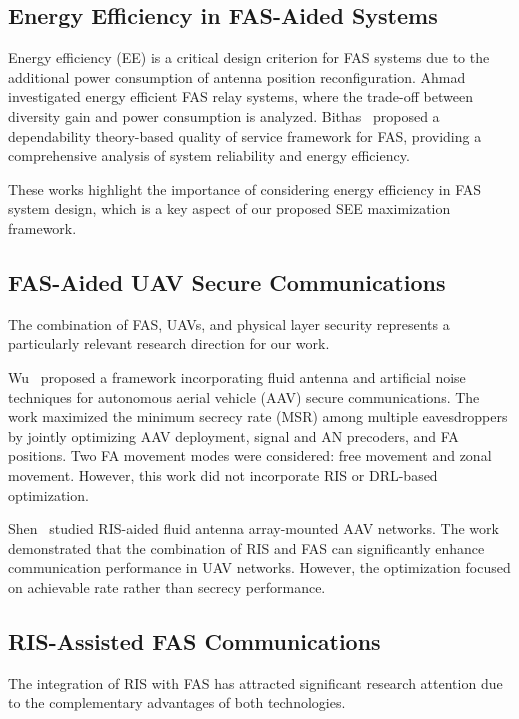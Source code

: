 \subsection{Energy Efficiency in FAS-Aided Systems}

Energy efficiency (EE) is a critical design criterion for FAS systems due to the additional power consumption of antenna position reconfiguration. Ahmad~\cite{ahmad2025energy} investigated energy efficient FAS relay systems, where the trade-off between diversity gain and power consumption is analyzed. Bithas~\cite{bithas2025dependability} proposed a dependability theory-based quality of service framework for FAS, providing a comprehensive analysis of system reliability and energy efficiency.

These works highlight the importance of considering energy efficiency in FAS system design, which is a key aspect of our proposed SEE maximization framework.

\subsection{FAS-Aided UAV Secure Communications}

The combination of FAS, UAVs, and physical layer security represents a particularly relevant research direction for our work.

Wu~\cite{wu2025faaav} proposed a framework incorporating fluid antenna and artificial noise techniques for autonomous aerial vehicle (AAV) secure communications. The work maximized the minimum secrecy rate (MSR) among multiple eavesdroppers by jointly optimizing AAV deployment, signal and AN precoders, and FA positions. Two FA movement modes were considered: free movement and zonal movement. However, this work did not incorporate RIS or DRL-based optimization.

Shen~\cite{shen2025ris} studied RIS-aided fluid antenna array-mounted AAV networks. The work demonstrated that the combination of RIS and FAS can significantly enhance communication performance in UAV networks. However, the optimization focused on achievable rate rather than secrecy performance.

\subsection{RIS-Assisted FAS Communications}

The integration of RIS with FAS has attracted significant research attention due to the complementary advantages of both technologies.

